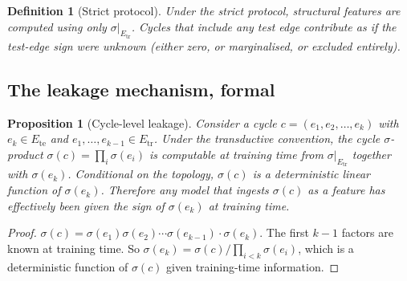 \documentclass[11pt,a4paper]{article}
\newtheorem{definition}[theorem]{Definition}
\newtheorem{proposition}[theorem]{Proposition}
\theoremstyle{remark}
\begin{document}
\begin{definition}[Strict protocol]
Under the \emph{strict protocol}, structural features are computed
using only $\sigma|_{E_{\text{tr}}}$. Cycles that include any
test edge contribute as if the test-edge sign were unknown
(either zero, or marginalised, or excluded entirely).
\end{definition}

\subsection{The leakage mechanism, formal}

\begin{proposition}[Cycle-level leakage]\label{prop:cycle-leakage}
Consider a cycle $c = (e_1, e_2, \dots, e_k)$ with $e_k \in
E_{\text{te}}$ and $e_1, \dots, e_{k-1} \in E_{\text{tr}}$. Under
the transductive convention, the cycle $\sigma$-product
$\sigma(c) = \prod_i \sigma(e_i)$ is computable at training time
from $\sigma|_{E_{\text{tr}}}$ together with $\sigma(e_k)$.
Conditional on the topology, $\sigma(c)$ is a deterministic
linear function of $\sigma(e_k)$. Therefore any model that
ingests $\sigma(c)$ as a feature has effectively been given the
sign of $\sigma(e_k)$ at training time.
\end{proposition}

\begin{proof}
$\sigma(c) = \sigma(e_1) \sigma(e_2) \cdots \sigma(e_{k-1}) \cdot \sigma(e_k)$.
The first $k-1$ factors are known at training time. So
$\sigma(e_k) = \sigma(c) / \prod_{i<k} \sigma(e_i)$, which is a
deterministic function of $\sigma(c)$ given training-time
information.
\end{proof}
\end{document}
